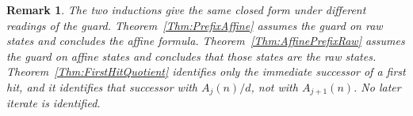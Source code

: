 \documentclass[11pt,letterpaper]{article}
\newtheorem{remark}[theorem]{Remark}
\begin{document}
\begin{remark}
The two inductions give the same closed form under different readings of the guard. Theorem~\ref{Thm:PrefixAffine} assumes the guard on raw states and concludes the affine formula. Theorem~\ref{Thm:AffinePrefixRaw} assumes the guard on affine states and concludes that those states are the raw states. Theorem~\ref{Thm:FirstHitQuotient} identifies only the immediate successor of a first hit, and it identifies that successor with \(A_{j}(n)/d\), not with \(A_{j+1}(n)\). No later iterate is identified.
\end{remark}
\end{document}
